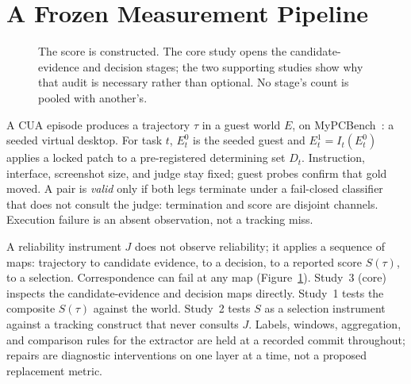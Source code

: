 \documentclass[sigconf,anonymous]{aamas}
\begin{document}
\section{A Frozen Measurement Pipeline}
\label{sec:pipeline}

\begin{figure}[t]
\centering
{}
\caption{The score is constructed. The core study opens the candidate-evidence and decision stages; the two supporting studies show why that audit is necessary rather than optional. No stage's count is pooled with another's.}
\label{fig:pipeline}
\end{figure}

A CUA episode produces a trajectory $\tau$ in a guest world $E$, on MyPCBench~\citep{jang2026mypcbench}: a seeded virtual desktop.
For task $t$, $E_t^{0}$ is the seeded guest and $E_t^{1}=I_t(E_t^{0})$ applies a locked patch to a pre-registered determining set $D_t$.
Instruction, interface, screenshot size, and judge stay fixed; guest probes confirm that gold moved.
A pair is \emph{valid} only if both legs terminate under a fail-closed classifier that does not consult the judge: termination and score are disjoint channels.
Execution failure is an absent observation, not a tracking miss.

A reliability instrument $J$ does not observe reliability; it applies a sequence of maps: trajectory to candidate evidence, to a decision, to a reported score $S(\tau)$, to a selection.
Correspondence can fail at any map (Figure~\ref{fig:pipeline}).
Study~3 (core) inspects the candidate-evidence and decision maps directly.
Study~1 tests the composite $S(\tau)$ against the world.
Study~2 tests $S$ as a selection instrument against a tracking construct that never consults $J$.
Labels, windows, aggregation, and comparison rules for the extractor are held at a recorded commit throughout; repairs are diagnostic interventions on one layer at a time, not a proposed replacement metric.
\end{document}
